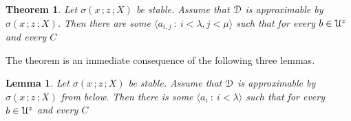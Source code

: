 \documentclass{amsproc}
\makeatletter
\newcommand{\mylabel}[1]{{#1}\hfill}
\renewenvironment{itemize}
  {\begin{list}{$\triangleright$}{%
  \setlength{\parskip}{0mm}
  \setlength{\topsep}{.1\baselineskip}
  \setlength{\rightmargin}{0mm}
  \setlength{\listparindent}{0mm}
  \setlength{\itemindent}{0mm}
  \setlength{\labelwidth}{3ex}
  \setlength{\itemsep}{.1\baselineskip}
  \setlength{\parsep}{.1\baselineskip}
  \setlength{\partopsep}{0mm}
  \setlength{\labelsep}{1ex}
  \setlength{\leftmargin}{\labelwidth+\labelsep}
  \let\makelabel\mylabel}}{%
\end{list}}
\newcounter{thm}
\theoremstyle{mio}
\newtheorem{theorem}[thm]{Theorem}\tcolorboxenvironment{theorem}{mythm}
\newtheorem{lemma}[thm]{Lemma}\tcolorboxenvironment{lemma}{mythm}
\newtheorem{fact}[thm]{Fact}\tcolorboxenvironment{fact}{mythm}
\providecommand{\proofNameStyle}{\bfseries}
\renewenvironment{proof}[1][\proofname]{\par
  \pushQED{\qed}%
  \normalfont%
  \trivlist
  \item[\hskip\labelsep
        \proofNameStyle
    #1\@addpunct{.}]\ignorespaces
}{%
  \popQED\endtrivlist\@endpefalse
}
\makeatother
\begin{document}



    




\begin{theorem}\label{thm_stability_definability}
  Let $\sigma(x\,;z\,;X)$ be stable.
  Assume that ${\EuScript D}$ is approximable by $\sigma(x\,;z\,;X)$.
  Then there are some $\langle a_{i,j}\ :\ i<\lambda,j<\mu\rangle$ such that for every $b\in{\EuScript U}^z$ and every $C$\medskip

  \medskip

\end{theorem}

\begin{proof}
  The theorem is an immediate consequence of the following three lemmas.
\end{proof}

\begin{lemma}\label{lem_1_inf}
  Let $\sigma(x\,;z\,;X)$ be stable.
  Assume that ${\EuScript D}$ is approximable by $\sigma(x\,;z\,;X)$ from below.
  Then there is some $\langle a_i\ :\ i<\lambda\rangle$ such that for every $b\in{\EuScript U}^z$ and every $C$\medskip

  \medskip 

\end{lemma}
\end{document}
